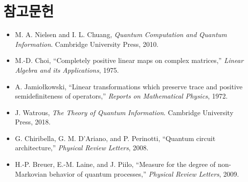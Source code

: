 \documentclass[11pt,a4paper]{article}
\begin{document}
\section*{참고문헌}

\begin{itemize}
  \item M. A. Nielsen and I. L. Chuang, \textit{Quantum Computation and Quantum Information}. Cambridge University Press, 2010.
  \item M.-D. Choi, ``Completely positive linear maps on complex matrices,'' \textit{Linear Algebra and its Applications}, 1975.
  \item A. Jamio{\l}kowski, ``Linear transformations which preserve trace and positive semidefiniteness of operators,'' \textit{Reports on Mathematical Physics}, 1972.
  \item J. Watrous, \textit{The Theory of Quantum Information}. Cambridge University Press, 2018.
  \item G. Chiribella, G. M. D'Ariano, and P. Perinotti, ``Quantum circuit architecture,'' \textit{Physical Review Letters}, 2008.
  \item H.-P. Breuer, E.-M. Laine, and J. Piilo, ``Measure for the degree of non-Markovian behavior of quantum processes,'' \textit{Physical Review Letters}, 2009.
\end{itemize}
\end{document}
